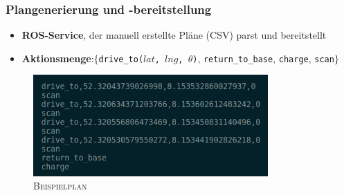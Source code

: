 \documentclass{beamer}
\newcommand{\code}[1]{\colorbox{light-gray}{\texttt{#1}}}
\begin{document}
\begin{frame}
  \frametitle{Plangenerierung und -bereitstellung}
  \begin{itemize}
    \item \textbf{ROS-Service}, der manuell erstellte Pläne (CSV) parst und bereitstellt
    \item \textbf{Aktionsmenge}:\newline $\{$\code{drive\_to($lat$, $lng$, $\theta$)}, \code{return\_to\_base}, \code{charge}, \code{scan}$\}$
  \end{itemize}
  \begin{figure}[H]
    \centering
    \includegraphics[width=0.8\textwidth]{img/plan_example.png}
    \caption*{\textsc{Beispielplan}}
  \end{figure}
\end{frame}
\end{document}
